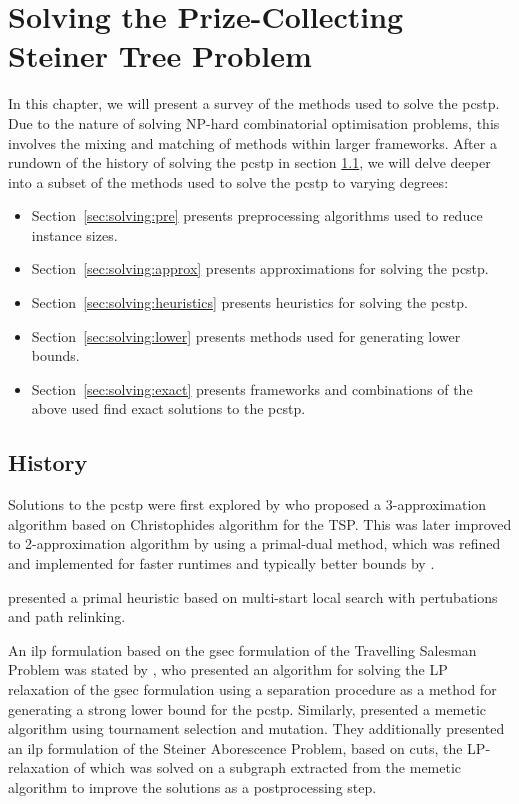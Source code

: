 \chapter{Solving the Prize-Collecting Steiner Tree Problem}
\label{chap:solving}

In this chapter, we will present a survey of the methods used to solve the \gls{pcstp}. Due to the nature of solving
NP-hard combinatorial optimisation problems, this involves the mixing and matching of methods within larger frameworks.
 After a rundown of the history of solving the \gls{pcstp} in section \ref{sec:solving:history}, we will delve deeper into a subset of the methods used to solve the \gls{pcstp} to varying degrees:
\begin{itemize}
\item Section~\ref{sec:solving:pre} presents preprocessing algorithms used to reduce instance sizes.
\item Section~\ref{sec:solving:approx} presents approximations for solving the \gls{pcstp}.
\item Section~\ref{sec:solving:heuristics} presents heuristics for solving the \gls{pcstp}.
\item Section~\ref{sec:solving:lower} presents methods used for generating lower bounds.
\item Section~\ref{sec:solving:exact} presents frameworks and combinations of the above used find exact solutions
   to the \gls{pcstp}.
\end{itemize}

\section{History}
\label{sec:solving:history}

Solutions to the \gls{pcstp} were first explored by \citet{Bienstock1993} who
proposed a 3-approximation algorithm based on Christophides algorithm for the TSP.
This was later improved to 2-approximation algorithm by
\citet{goemans1997primal} using a primal-dual method,
which was refined and implemented
for faster runtimes and typically better
bounds by \citet{Johnson:2000:PCS:338219.338637}.

\citet{canuto2001local} presented a primal heuristic based on multi-start
local search with pertubations and path relinking.

An \gls{ilp} formulation based on the \gls{gsec} formulation of the Travelling Salesman Problem was
stated by \citet{lucena2004strong}, who presented an algorithm for solving the LP relaxation of the \gls{gsec} formulation using
a separation procedure as a method for generating a strong lower bound for the \gls{pcstp}. Similarly, \citet{Ljubic:2004:memetic}
presented a memetic algorithm using tournament selection and mutation. They additionally presented an \gls{ilp} formulation of the Steiner
 Aborescence Problem, based on cuts, the LP-relaxation of which was solved on a subgraph extracted from the memetic algorithm to
 improve the solutions as a postprocessing step.

